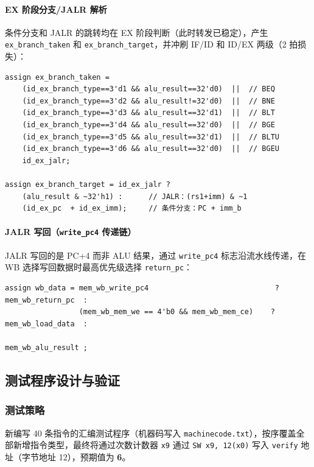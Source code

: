\documentclass[12pt,hyperref,a4paper,UTF8]{ctexart}
\begin{document}
\paragraph{EX 阶段分支/JALR 解析}

条件分支和 JALR 的跳转均在 EX 阶段判断（此时转发已稳定），产生 \texttt{ex\_branch\_taken} 和 \texttt{ex\_branch\_target}，并冲刷 IF/ID 和 ID/EX 两级（2 拍损失）：

\begin{lstlisting}[caption={EX 阶段分支解析与 JALR 跳转}]
assign ex_branch_taken =
    (id_ex_branch_type==3'd1 && alu_result==32'd0)  ||  // BEQ
    (id_ex_branch_type==3'd2 && alu_result!=32'd0)  ||  // BNE
    (id_ex_branch_type==3'd3 && alu_result==32'd1)  ||  // BLT
    (id_ex_branch_type==3'd4 && alu_result==32'd0)  ||  // BGE
    (id_ex_branch_type==3'd5 && alu_result==32'd1)  ||  // BLTU
    (id_ex_branch_type==3'd6 && alu_result==32'd0)  ||  // BGEU
    id_ex_jalr;

assign ex_branch_target = id_ex_jalr ?
    (alu_result & ~32'h1) :      // JALR：(rs1+imm) & ~1
    (id_ex_pc  + id_ex_imm);     // 条件分支：PC + imm_b
\end{lstlisting}

\paragraph{JALR 写回（\texttt{write\_pc4} 传递链）}

JALR 写回的是 PC+4 而非 ALU 结果，通过 \texttt{write\_pc4} 标志沿流水线传递，在 WB 选择写回数据时最高优先级选择 \texttt{return\_pc}：

\begin{lstlisting}[caption={WB 写回数据选择（含 JALR）}]
assign wb_data = mem_wb_write_pc4                             ? mem_wb_return_pc  :
                 (mem_wb_mem_we == 4'b0 && mem_wb_mem_ce)    ? mem_wb_load_data  :
                                                                mem_wb_alu_result ;
\end{lstlisting}

\subsection{测试程序设计与验证}

\subsubsection{测试策略}

新编写 40 条指令的汇编测试程序（机器码写入 \texttt{machinecode.txt}），按序覆盖全部新增指令类型，最终将通过次数计数器 \texttt{x9} 通过 \texttt{SW x9, 12(x0)} 写入 \texttt{verify} 地址（字节地址 12），预期值为 \textbf{6}。
\end{document}
